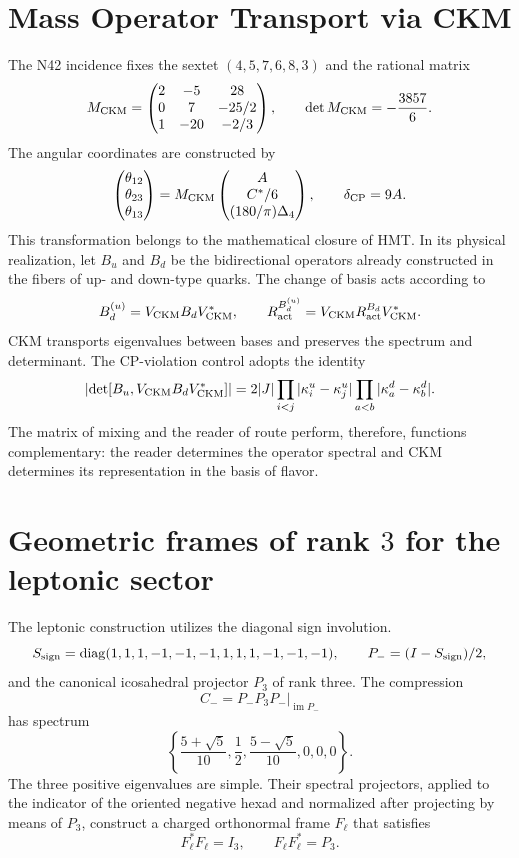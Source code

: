 \section{Mass Operator Transport via CKM}
\label{sec:transporte-ckm-operadores-rev11}

The N42 incidence fixes the sextet \((4,5,7,6,8,3)\) and the rational matrix
\[
 M_{\rm CKM}=
 \begin{pmatrix}
 2&-5&28\\
 0&7&-25/2\\
 1&-20&-2/3
 \end{pmatrix},
 \qquad \det M_{\rm CKM}=-\frac{3857}{6}.
\]
The angular coordinates are constructed by
\[
 \begin{pmatrix}\theta_{12}\\\theta_{23}\\\theta_{13}\end{pmatrix}
 =M_{\rm CKM}
 \begin{pmatrix}A\\ C^*/6\\ (180/\pi)\Delta_4\end{pmatrix},
 \qquad \delta_{\rm CP}=9A.
\]
This transformation belongs to the mathematical closure of HMT. In its
physical realization, let \(B_u\) and \(B_d\) be the bidirectional operators already constructed in the
fibers of up- and down-type quarks. The change of basis acts according to
\begin{equation}
 B_d^{(u)}=V_{\rm CKM}B_dV_{\rm CKM}^*,
 \qquad
 R_{\rm act}^{B_d^{(u)}}
 =V_{\rm CKM}R_{\rm act}^{B_d}V_{\rm CKM}^*.
 \label{eq:transporte-ckm-kappa-rev11}
\end{equation}
CKM transports eigenvalues between bases and preserves the spectrum and determinant.
The CP-violation control adopts the identity
\[
 \left|\det[B_u,V_{\rm CKM}B_dV_{\rm CKM}^*]\right|
 =2|J|\prod_{i<j}|\kappa_i^u-\kappa_j^u|
       \prod_{a<b}|\kappa_a^d-\kappa_b^d|.
\]
The matrix of mixing and the reader of route perform, therefore, functions
complementary: the reader determines the operator spectral and CKM determines
its representation in the basis of flavor.

\section{Geometric frames of rank \(3\) for the leptonic sector}
\label{sec:frames-pmns-rev11}

The leptonic construction utilizes the diagonal sign involution.
\[
 S_{\rm sign}=\operatorname{diag}(1,1,1,-1,-1,-1,1,1,1,-1,-1,-1),
 \qquad P_-=(I-S_{\rm sign})/2,
\]
and the canonical icosahedral projector \(P_3\) of rank three. The compression
\[
 C_-=P_-P_3P_-\big|_{\operatorname{im}P_-}
\]
has spectrum
\[
 \left\{\frac{5+\sqrt5}{10},\frac12,
 \frac{5-\sqrt5}{10},0,0,0\right\}.
\]
The three positive eigenvalues are simple. Their spectral projectors,
applied to the indicator of the oriented negative hexad and normalized after
projecting by means of \(P_3\), construct a charged orthonormal frame
\(F_\ell\) that satisfies
\[
 F_\ell^*F_\ell=I_3,
 \qquad F_\ell F_\ell^*=P_3.
\]

